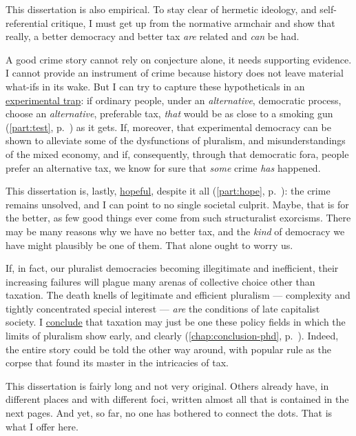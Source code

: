 This dissertation is also empirical. 
To stay clear of hermetic ideology, and self-referential critique, I must get up from the normative armchair and show that really, a better democracy and better tax \emph{are} related and \emph{can} be had.

A good crime story cannot rely on conjecture alone, it needs supporting evidence. 
I cannot provide an instrument of crime because history does not leave material what-ifs in its wake. 
But I can try to capture these hypotheticals in an \hyperref[part:test]{experimental trap}: if ordinary %
people, under an \emph{alternative}, democratic process, choose an \emph{alternative}, preferable tax, \emph{that} would be as close to a smoking gun (\autoref{part:test}, p.~\pageref{part:test}) as it gets. 
If, moreover, that experimental democracy can be shown to alleviate some of the dysfunctions of pluralism, and misunderstandings of the mixed economy, and if, consequently, through that democratic fora, people prefer an alternative tax, we know for sure that \emph{some} crime \emph{has} happened. 

This dissertation is, lastly, \hyperref[part:hope]{hopeful}, despite it all (\autoref{part:hope}, p.~\pageref{part:hope}): the crime remains unsolved, and I can point to no single societal culprit. 
Maybe, that is for the better, as few good things ever come from such structuralist exorcisms. 
There may be many reasons why we have no better tax, and the \emph{kind} of democracy we have might plausibly be one of them. 
That alone ought to worry us.

If, in fact, our pluralist democracies becoming illegitimate and inefficient, their increasing failures will plague many arenas of collective choice other than taxation. 
The death knells of legitimate and efficient pluralism --- complexity and tightly concentrated special interest --- \emph{are} the conditions of late capitalist society. %
I \hyperref[chap:conclusion-phd]{conclude} that taxation may just be one these policy fields in which the limits of pluralism show early, and clearly (\autoref{chap:conclusion-phd}, p.~\pageref{chap:conclusion-phd}). %
Indeed, the entire story could be told the other way around, with popular rule as the corpse that found its master in the intricacies of tax.

This dissertation is fairly long and not very original. 
Others already have, in different places and with different foci, written almost all that is contained in the next \pageref{end} pages. And yet, so far, no one has bothered to connect the dots. 
That is what I offer here.

